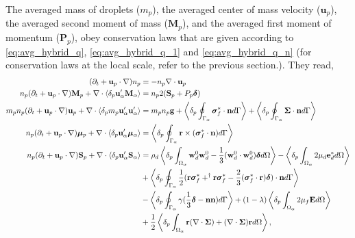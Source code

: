 The averaged mass of droplets ($m_p$), the averaged center of mass velocity ($\textbf{u}_p$), the averaged second moment of mass ($\textbf{M}_p$), and the averaged first moment of momentum ($\textbf{P}_p$), 
obey conservation laws that are given according to \ref{eq:avg_hybrid_q}, \ref{eq:avg_hybrid_q_1} and \ref{eq:avg_hybrid_q_n} (for conservation laws at the local scale, refer to the previous section.).
They read, 
\begin{align}
    (\pddt + \textbf{u}_p \cdot \grad)n_p
    &=
    - n_p \div \textbf{u}_p\label{eq:mass_p}\\
    n_p (\pddt + \textbf{u}_p \cdot \grad) \textbf{M}_p
    +\div  \pavg{\textbf{u}_\alpha'\textbf{M}_\alpha}
    &=
    n_p2  (\textbf{S}_p+P_p\bm\delta)
    \label{eq:dt_hybrid_Mp}\\
    \label{eq:dt_hybrid_up}
    m_p n_p(\pddt + \textbf{u}_p \cdot \grad)\textbf{u}_p
    + \div \pavg{m_p \textbf{u}_\alpha'\textbf{u}_\alpha'}
    &=
    m_p n_p \textbf{g}
    + \pSavg{\bm\sigma_f^* \cdot \textbf{n}} + \pSavg{\bm\Sigma \cdot \textbf{n}}\\
    \label{eq:dt_hybrid_mup}
    n_p (\pddt + \textbf{u}_p \cdot \grad) \bm{\mu}_p
    +\div  \pavg{\textbf{u}_\alpha'\bm\mu_\alpha}
    &=
    \pSavg{\textbf{r}\times(\bm\sigma_f^*\cdot \textbf{n})}
    \\
    n_p (\pddt + \textbf{u}_p \cdot \grad) \textbf{S}_p
    +\div  \pavg{\textbf{u}_\alpha'\textbf{S}_\alpha}
    &=
    \rho_d \pOavg{
        \textbf{w}_d^0  \textbf{w}_d^0 
        -\frac{1}{3} (\textbf{w}_d^0 \cdot  \textbf{w}_d^0) \bm\delta
    }
    - \pOavg{2 \mu_d\textbf{e}_d^*} \nonumber \\
    &+\pSavg{\frac{1}{2}(\textbf{r}\bm\sigma_f^*+^\dagger\textbf{r}\bm\sigma_f^*-\frac{2}{3}(\bm\sigma_f^* \cdot \textbf{r})\bm\delta)\cdot \textbf{n}}\nonumber\\
    &-  \pSavg{\gamma (\frac{1}{3}\bm\delta - \textbf{nn})}
     + (1-\lambda)\pOavg{2\mu_f\textbf{E}}\nonumber \\
     &+ \frac{1}{2}\pOavg{\textbf{r}(\div\bm\Sigma)+ (\div\bm\Sigma) \textbf{r}},
    \label{eq:dt_hybrid_Sp}
\end{align}
